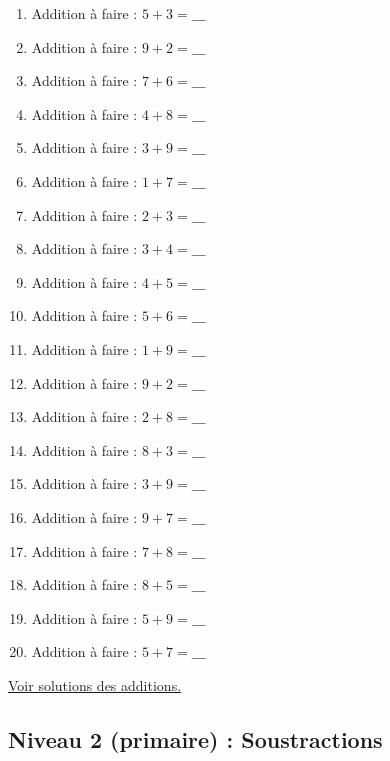 \documentclass[11pt]{article}
\begin{document}
\begin{enumerate}
\item Addition à faire :   \(5 + 3 = \_\_\_\)
\item Addition à faire :   \(9 + 2 = \_\_\_\)
\item Addition à faire :   \(7 + 6 = \_\_\_\)
\item Addition à faire :   \(4 + 8 = \_\_\_\)
\item Addition à faire :   \(3 + 9 = \_\_\_\)
\item Addition à faire :   \(1 + 7 = \_\_\_\)
\item Addition à faire :   \(2 + 3 = \_\_\_\)
\item Addition à faire :   \(3 + 4 = \_\_\_\)
\item Addition à faire :   \(4 + 5 = \_\_\_\)
\item Addition à faire :   \(5 + 6 = \_\_\_\)
\item Addition à faire :   \(1 + 9 = \_\_\_\)
\item Addition à faire :   \(9 + 2 = \_\_\_\)
\item Addition à faire :   \(2 + 8 = \_\_\_\)
\item Addition à faire :   \(8 + 3 = \_\_\_\)
\item Addition à faire :   \(3 + 9 = \_\_\_\)
\item Addition à faire :   \(9 + 7 = \_\_\_\)
\item Addition à faire :   \(7 + 8 = \_\_\_\)
\item Addition à faire :   \(8 + 5 = \_\_\_\)
\item Addition à faire :   \(5 + 9 = \_\_\_\)
\item Addition à faire :   \(5 + 7 = \_\_\_\)
\end{enumerate}



\hyperref[org9ea4aca]{Voir solutions des additions.}



\newpage

\subsection{Niveau 2 (primaire) : Soustractions}
\label{sec:orgd8c5f9c}


\label{orga47d3aa}
\end{document}
